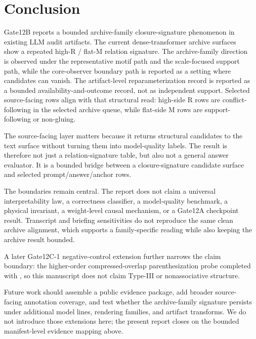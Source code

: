 \documentclass[11pt]{article}
\newcommand{\code}[1]{\texttt{\detokenize{#1}}}
\begin{document}
\section{Conclusion}

Gate12B reports a bounded archive-family closure-signature phenomenon in
existing LLM audit artifacts. The current dense-transformer archive surfaces
show a repeated high-R / flat-M relation signature. The archive-family
direction is observed under the representative motif path and the scale-focused
support path, while the core-observer boundary path is reported as a setting
where candidates can vanish. The artifact-level reparameterization record is
reported as a bounded availability-and-outcome record, not as independent
support. Selected source-facing rows align with that structural
read: high-side R rows are conflict-following in the selected archive queue,
while flat-side M rows are support-following or non-gluing.

The source-facing layer matters because it returns structural candidates to
the text surface without turning them into model-quality labels. The result is
therefore not just a relation-signature table, but also not a general answer
evaluator. It is a bounded bridge between a closure-signature candidate surface
and selected prompt/answer/anchor rows.

The boundaries remain central. The report does not claim a universal
interpretability law, a correctness classifier, a model-quality benchmark, a
physical invariant, a weight-level causal mechanism, or a Gate12A checkpoint
result. Transcript and briefing sensitivities do not reproduce the same clean
archive alignment, which supports a family-specific reading while also keeping
the archive result bounded.

A later Gate12C-1 negative-control extension further narrows the claim
boundary: the higher-order compressed-overlap parenthesization probe completed
with \code{no_directional_support}, so this manuscript does not claim Type-III
or nonassociative structure.

Future work should assemble a public evidence package, add broader
source-facing annotation coverage, and test whether the archive-family
signature persists under additional model lines, rendering families, and
artifact transforms. We do not introduce those extensions here; the present
report closes on the bounded manifest-level evidence mapping above.
\end{document}
